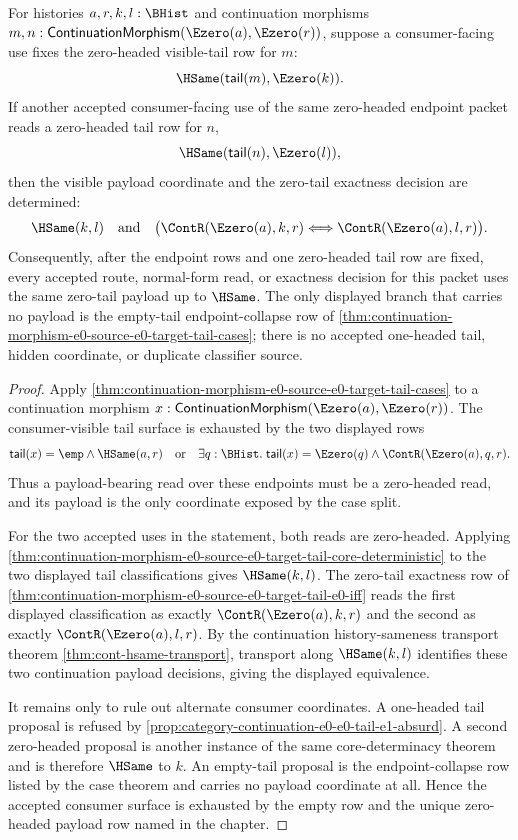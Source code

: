 \begin{corollary}
\label{cor:continuation-morphism-e0-source-e0-target-consumer-determinacy}
For histories $a,r,k,l:\BHist$ and continuation morphisms
$m,n:\mathsf{ContinuationMorphism}(\Ezero(a),\Ezero(r))$, suppose a
consumer-facing use fixes the zero-headed visible-tail row for $m$:
$$
\HSame(\mathsf{tail}(m),\Ezero(k)).
$$
If another accepted consumer-facing use of the same zero-headed endpoint packet
reads a zero-headed tail row for $n$,
$$
\HSame(\mathsf{tail}(n),\Ezero(l)),
$$
then the visible payload coordinate and the zero-tail exactness decision are
determined:
$$
\HSame(k,l)
\quad\text{and}\quad
\bigl(\ContR(\Ezero(a),k,r)\Longleftrightarrow\ContR(\Ezero(a),l,r)\bigr).
$$
Consequently, after the endpoint rows and one zero-headed tail row are fixed,
every accepted route, normal-form read, or exactness decision for this packet
uses the same zero-tail payload up to $\HSame$. The only displayed branch that
carries no payload is the empty-tail endpoint-collapse row of
\autoref{thm:continuation-morphism-e0-source-e0-target-tail-cases}; there is no
accepted one-headed tail, hidden coordinate, or duplicate classifier source.
\end{corollary}
\begin{proof}
Apply \autoref{thm:continuation-morphism-e0-source-e0-target-tail-cases} to a
continuation morphism
$x:\mathsf{ContinuationMorphism}(\Ezero(a),\Ezero(r))$. The consumer-visible
tail surface is exhausted by the two displayed rows
$$
\mathsf{tail}(x)=\emp\land\HSame(a,r)
\quad\text{or}\quad
\exists q:\BHist.\;\mathsf{tail}(x)=\Ezero(q)\land
\ContR(\Ezero(a),q,r).
$$
Thus a payload-bearing read over these endpoints must be a zero-headed read,
and its payload is the only coordinate exposed by the case split.

For the two accepted uses in the statement, both reads are zero-headed. Applying
\autoref{thm:continuation-morphism-e0-source-e0-target-tail-core-deterministic}
to the two displayed tail classifications gives $\HSame(k,l)$. The zero-tail
exactness row of
\autoref{thm:continuation-morphism-e0-source-e0-target-tail-e0-iff} reads the
first displayed classification as exactly $\ContR(\Ezero(a),k,r)$ and the second
as exactly $\ContR(\Ezero(a),l,r)$. By the continuation history-sameness
transport theorem \autoref{thm:cont-hsame-transport}, transport along
$\HSame(k,l)$ identifies these two continuation payload decisions, giving the
displayed equivalence.

It remains only to rule out alternate consumer coordinates. A one-headed tail
proposal is refused by
\autoref{prop:category-continuation-e0-e0-tail-e1-absurd}. A second zero-headed
proposal is another instance of the same core-determinacy theorem and is
therefore $\HSame$ to $k$. An empty-tail proposal is the endpoint-collapse row
listed by the case theorem and carries no payload coordinate at all. Hence the
accepted consumer surface is exhausted by the empty row and the unique
zero-headed payload row named in the chapter.
\end{proof}
